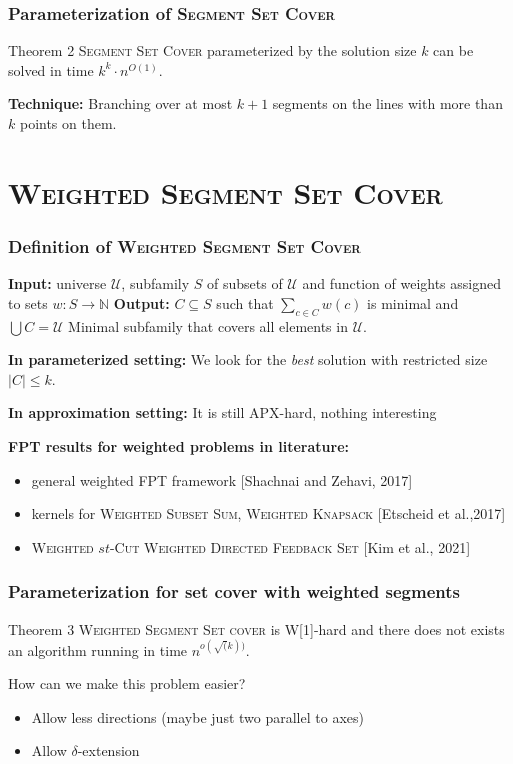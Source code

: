 \documentclass{beamer}
\begin{document}
\begin{frame}
\frametitle{Parameterization of \textsc{Segment Set Cover}}
\begin{block}{Theorem 2}
	\textsc{Segment Set Cover} parameterized by the solution size $k$
	can be solved in time $k^k \cdot n^{O(1)}$.
\end{block}

\textbf{Technique:} Branching over at most $k+1$
segments on the lines with more than $k$ points on them.
\end{frame}

\section{\textsc{Weighted Segment Set Cover}} 

\begin{frame}
\frametitle{Definition of \textsc{Weighted Segment Set Cover}}

\textbf{Input:} universe $\mathcal{U}$,
subfamily $S$ of subsets of $\mathcal{U}$
and function of weights assigned to sets $w : S \rightarrow \mathbb{N}$
\newline
\textbf{Output:} $C \subseteq S$ such that $\sum_{c \in C} w(c)$ is minimal and
$\bigcup C = \mathcal{U}$
\newline
Minimal subfamily that covers all elements in $\mathcal{U}$.

\bigskip
\textbf{In parameterized setting:}
We look for the \textit{best} solution with restricted size $|C| \le k$.

\textbf{In approximation setting:}
It is still APX-hard, nothing interesting
\bigskip

\textbf{FPT results for weighted problems in literature:}
\begin{itemize}
\item general weighted FPT framework {[Shachnai and Zehavi, 2017]}
\item kernels for \textsc{Weighted Subset Sum}, \textsc{Weighted Knapsack} {[Etscheid et al.,2017]}
\item \textsc{Weighted $st$-Cut} \textsc{Weighted Directed Feedback Set} {[Kim et al., 2021]}
\end{itemize}


\end{frame}

\begin{frame}
\frametitle{Parameterization for set cover with weighted segments}
\begin{block}{Theorem 3}
	\textsc{Weighted Segment Set cover} is W[1]-hard
	and there does not exists an algorithm running in time $n^{o(\sqrt(k))}$.
\end{block}

How can we make this problem easier?
\begin{itemize}
\item Allow less directions (maybe just two parallel to axes)
\item Allow $\delta$-extension
\end{itemize}
\end{frame}
\end{document}
